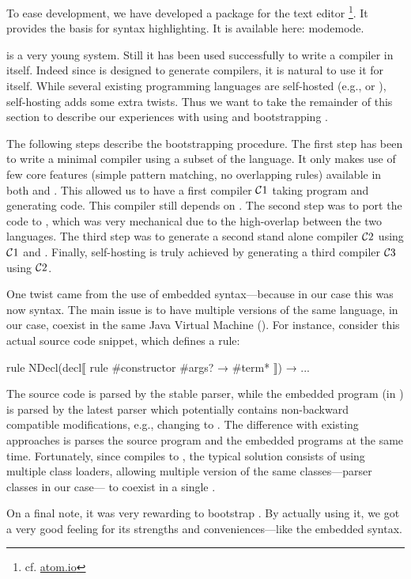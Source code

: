 To ease development, we have developed a \Tosca package for the
\Atom text editor \footnote{cf. \href{https://atom.io/}{atom.io}}.
It provides the basis for syntax highlighting. 
It is available here:
%
        {\Tosca mode}{\Tosca mode}.

\Tosca is a very young system. Still it has been used successfully
to write a \Tosca compiler in \Tosca itself. Indeed since \Tosca 
is designed to generate compilers, it is natural to use it for itself.
While several existing programming languages are self-hosted (e.g., \Lisp or \Rust),
self-hosting \Tosca adds some extra twists. Thus we want to take
the remainder of this section to describe our experiences with using
and bootstrapping \Tosca.

The following steps describe the bootstrapping procedure.
The first step has been to write a minimal \Tosca compiler using a subset of the \crsx language.
It only makes use of few core features (simple pattern matching, no overlapping rules) available
in both \crsx and \Tosca. This allowed us to have a first compiler $\mathcal{C}1$ taking \Tosca program
and generating \java code. This compiler still depends on \crsx. The second step was to port the \crsx code to \Tosca,
which was very mechanical due to the high-overlap between the two languages. The third step was to generate a second
stand alone compiler $\mathcal{C}2$ using $\mathcal{C}1$ and \crsx. Finally, self-hosting is truly achieved by generating a third
compiler $\mathcal{C}3$ using $\mathcal{C}2$.

One twist came from the use of embedded syntax---because in our case
this was now \Tosca syntax. The main issue is to have multiple
versions of the same language, \Tosca in our case, coexist in
the same Java Virtual Machine (\jvm).
%
For instance, consider this actual source code snippet, which defines
a \Tosca rule:
%
\begin{lstANTLR}
rule NDecl(decl⟦ rule #constructor #args? → #term* ⟧) 
  → ...
\end{lstANTLR}

The \Tosca source code is parsed by the stable 
\Tosca parser, while the embedded program (in ) is parsed
by the latest \Tosca parser which potentially contains
non-backward compatible modifications, e.g., changing  to .
The difference with existing approaches is \Tosca parses the
source program and the embedded programs at the same time. Fortunately, since \Tosca
compiles to \java, the typical solution consists of using multiple
class loaders, allowing multiple version of the same classes---parser classes in our case--- to coexist in a single \jvm.

On a final note, it was very rewarding to bootstrap \Tosca. 
By actually using it, we got a very good
feeling for its strengths and conveniences---like the embedded
syntax.

